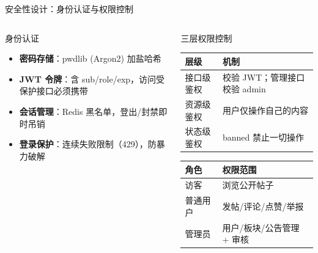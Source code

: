 \documentclass[aspectratio=169,UTF8]{ctexbeamer}
\begin{document}
\begin{frame}{安全性设计：身份认证与权限控制}
    \begin{columns}[T]
        \begin{block}{身份认证}
            \begin{itemize}
                \item \textbf{密码存储}：pwdlib (Argon2) 加盐哈希
                \item \textbf{JWT 令牌}：含 sub/role/exp，访问受保护接口必须携带
                \item \textbf{会话管理}：Redis 黑名单，登出/封禁即时吊销
                \item \textbf{登录保护}：连续失败限制（429），防暴力破解
            \end{itemize}
        \end{block}
        \begin{block}{三层权限控制}
            \small
            \begin{tabularx}{\linewidth}{lX}
                \toprule
                \textbf{层级} & \textbf{机制} \\
                \midrule
                接口级鉴权 & 校验 JWT；管理接口校验 admin \\
                资源级鉴权 & 用户仅操作自己的内容 \\
                状态级鉴权 & banned 禁止一切操作 \\
                \bottomrule
            \end{tabularx}
            \vspace{0.2cm}
            \small
            \begin{tabularx}{\linewidth}{lX}
                \toprule
                \textbf{角色} & \textbf{权限范围} \\
                \midrule
                访客 & 浏览公开帖子 \\
                普通用户 & 发帖/评论/点赞/举报 \\
                管理员 & 用户/板块/公告管理 + 审核 \\
                \bottomrule
            \end{tabularx}
        \end{block}
    \end{columns}
\end{frame}
\end{document}
